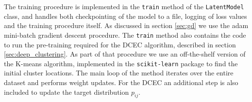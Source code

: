 % 

The training procedure is implemented in the \lstinline{train} method of the \lstinline{LatentModel} class, and handles both checkpointing of the model to a file, logging of loss values and the training procedure itself. As discussed in section \ref{sec:gd} we use the adam mini-batch gradient descent procedure. The \lstinline{train} method also contains the code to run the pre-training required for the DCEC algorithm, described in section \ref{sec:deep_clustering}. As part of that procedure we use an off-the-shelf version of the K-means algorithm, implemented in the \lstinline{scikit-learn} package \cite{Pedregosa2011} to find the initial cluster locations. The main loop of the method iterates over the entire dataset and performs weight updates. For the  DCEC an additional step is also included to update the target distribution $p_{ij}$.
